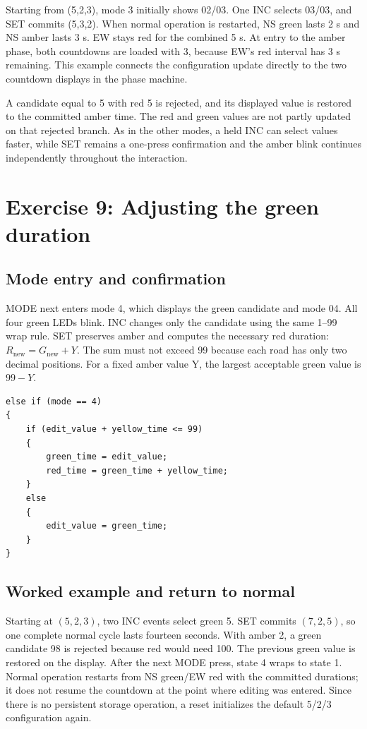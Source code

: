 \documentclass[a4paper]{article}
\newcommand{\topic}[1]{\subsection{#1}}
\begin{document}
Starting from (5,2,3), mode 3 initially shows 02/03. One INC selects 03/03,
and SET commits (5,3,2). When normal operation is restarted, NS green lasts
2 s and NS amber lasts 3 s. EW stays red for the combined 5 s. At entry to
the amber phase, both countdowns are loaded with 3, because EW's red interval
has 3 s remaining. This example connects the configuration update directly
to the two countdown displays in the phase machine.

A candidate equal to 5 with red 5 is rejected, and its displayed value is
restored to the committed amber time. The red and green values are not partly
updated on that rejected branch. As in the other modes, a held INC can select
values faster, while SET remains a one-press confirmation and the amber
blink continues independently throughout the interaction.


\clearpage
\section{Exercise 9: Adjusting the green duration}

\topic{Mode entry and confirmation}
MODE next enters mode 4, which displays the green candidate and mode 04.
All four green LEDs blink. INC changes only the candidate using the same
1--99 wrap rule. SET preserves amber and computes the necessary red duration:
\(R_{\mathrm{new}}=G_{\mathrm{new}}+Y\).
The sum must not exceed 99 because each road has only two decimal positions.
For a fixed amber value Y, the largest acceptable green value is \(99-Y\).

\par\noindent\begin{minipage}{\linewidth}
\begin{lstlisting}[caption={SET action for mode 4}]
else if (mode == 4)
{
    if (edit_value + yellow_time <= 99)
    {
        green_time = edit_value;
        red_time = green_time + yellow_time;
    }
    else
    {
        edit_value = green_time;
    }
}
\end{lstlisting}
\end{minipage}\par

\topic{Worked example and return to normal}
Starting at \((5,2,3)\), two INC events select green 5. SET commits
\((7,2,5)\), so one complete normal cycle lasts fourteen seconds.
With amber 2, a green candidate 98 is rejected because red would need 100.
The previous green value is restored on the display.
After the next MODE press, state 4 wraps to state 1. Normal operation restarts
from NS green/EW red with the committed durations; it does not resume the
countdown at the point where editing was entered. Since there is no persistent
storage operation, a reset initializes the default 5/2/3 configuration again.
\end{document}

